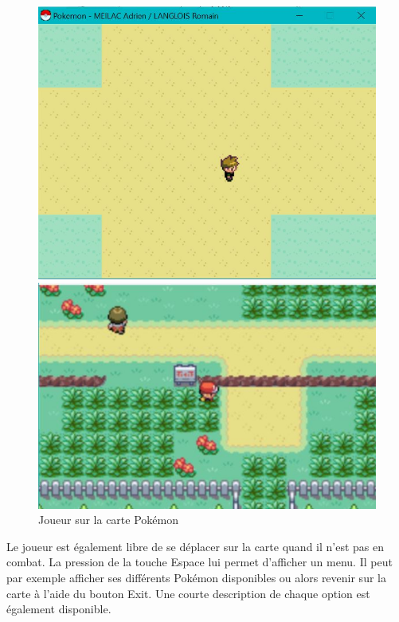 \begin{figure}[!h]
\begin{minipage}{0.49\textwidth}
\includegraphics[scale = 0.6]{../Images/map.jpg}
\end{minipage}
\begin{minipage}{0.49\textwidth}
\includegraphics[scale = 0.84]{../Images/vrai_jeu_map.jpg}
\end{minipage}
\caption{Joueur sur la carte Pokémon}
\end{figure}


Le joueur est également libre de se déplacer sur la carte quand il n'est pas en combat. La pression de la touche Espace lui permet d'afficher un menu. Il peut par exemple afficher ses différents Pokémon disponibles ou alors revenir sur la carte à l'aide du bouton Exit. Une courte description de chaque option est également disponible.


